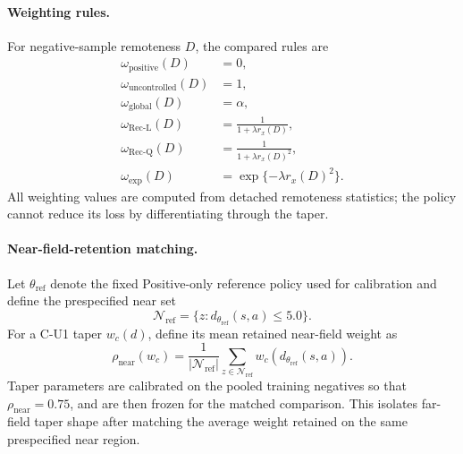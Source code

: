 \documentclass{article}
\theoremstyle{plain}
\theoremstyle{definition}
\theoremstyle{remark}
\begin{document}
\paragraph{Weighting rules.}
For negative-sample remoteness $D$, the compared rules are
\begin{equation}
\begin{aligned}
    \omega_{\mathrm{positive}}(D)
    &=0,\\
    \omega_{\mathrm{uncontrolled}}(D)
    &=1,\\
    \omega_{\mathrm{global}}(D)
    &=\alpha,\\
    \omega_{\mathrm{Rec\text{-}L}}(D)
    &=
    \frac{1}{1+\lambda r_x(D)},\\
    \omega_{\mathrm{Rec\text{-}Q}}(D)
    &=
    \frac{1}{1+\lambda r_x(D)^2},\\
    \omega_{\mathrm{exp}}(D)
    &=
    \exp\{-\lambda r_x(D)^2\}.
\end{aligned}
\label{eq:controlled_taper_rules}
\end{equation}
All weighting values are computed from detached remoteness statistics;
the policy cannot reduce its loss by differentiating through the taper.

\paragraph{Near-field-retention matching.}
Let $\theta_{\mathrm{ref}}$ denote the fixed Positive-only reference policy
used for calibration and define the prespecified near set
\[
\mathcal N_{\mathrm{ref}}
=
\{z:d_{\theta_{\mathrm{ref}}}(s,a)\leq5.0\}.
\]
For a C-U1 taper $w_c(d)$, define its mean retained near-field weight as
\begin{equation}
    \rho_{\mathrm{near}}(w_c)
    =
    \frac{1}{|\mathcal N_{\mathrm{ref}}|}
    \sum_{z\in\mathcal N_{\mathrm{ref}}}
    w_c\!\left(d_{\theta_{\mathrm{ref}}}(s,a)\right).
    \label{eq:near_retention}
\end{equation}
Taper parameters are calibrated on the pooled training negatives so that
\(\rho_{\mathrm{near}}=0.75\), and are then frozen for the matched comparison.
This isolates far-field taper shape after matching the average weight retained
on the same prespecified near region.
\end{document}

